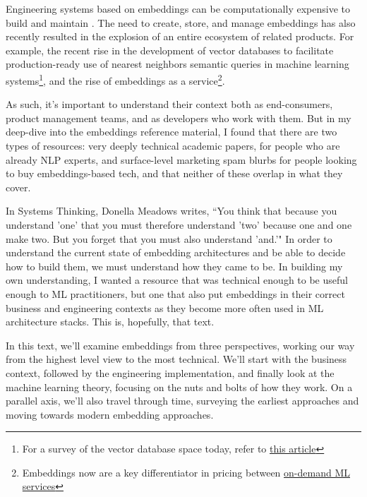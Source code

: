 \documentclass[11pt, table]{diazessay} %
\begin{document}
\begin{sloppypar}
Engineering systems based on embeddings can be computationally expensive to build and maintain \citep{sharir2020cost}. The need to create, store, and manage embeddings has also recently resulted in the explosion of an entire ecosystem of related products. For example, the recent rise in the development of vector databases to facilitate production-ready use of nearest neighbors semantic queries in machine learning systems\footnote{For a survey of the vector database space today, refer to  \href{https://dmitry-kan.medium.com/landscape-of-vector-databases-d241b279f486}{this article}}, and the rise of embeddings as a service\footnote{Embeddings now are a key differentiator in pricing between \href{https://openai.com/pricing}{on-demand ML services}}.

As such, it's important to understand their context both as end-consumers, product management teams, and as developers who work with them. But in my deep-dive into the embeddings reference material, I found that there are two types of resources: very deeply technical academic papers, for people who are already NLP experts, and surface-level marketing spam blurbs for people looking to buy embeddings-based tech, and that neither of these overlap in what they cover.  

In Systems Thinking, Donella Meadows writes, “You think that because you understand 'one' that you must therefore understand 'two' because one and one make two. But you forget that you must also understand 'and.'" \citep{meadows2008thinking} In order to understand the current state of embedding architectures and be able to decide how to build them, we must understand how they came to be. In building my own understanding, I wanted a resource that was technical enough to be useful enough to ML practitioners, but one that also put embeddings in their correct business and engineering contexts as they become more often used in ML architecture stacks. This is, hopefully, that text.

In this text, we'll examine embeddings from three perspectives, working our way from the highest level view to the most technical. We'll start with the business context, followed by the engineering implementation, and finally look at the machine learning theory, focusing on the nuts and bolts of how they work. On a parallel axis, we'll also travel through time, surveying the earliest approaches and moving towards modern embedding approaches.  


\end{sloppypar}
\end{document}
